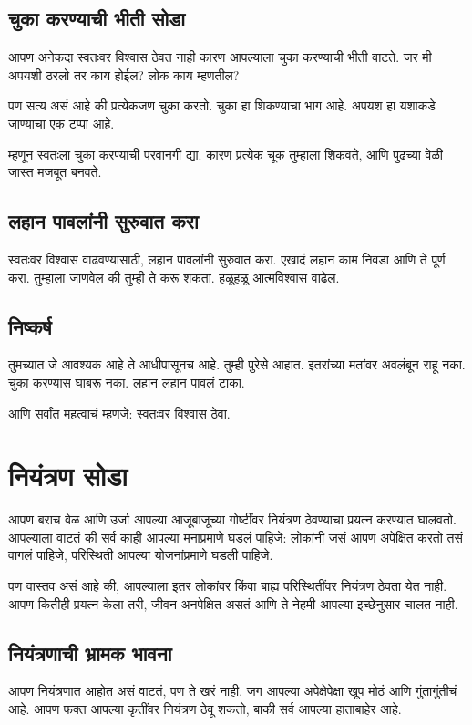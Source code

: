 \section*{चुका करण्याची भीती सोडा}
आपण अनेकदा स्वतःवर विश्वास ठेवत नाही कारण 
आपल्याला चुका करण्याची भीती वाटते. 
जर मी अपयशी ठरलो तर काय होईल? 
लोक काय म्हणतील? 

पण सत्य असं आहे की प्रत्येकजण चुका करतो. 
चुका हा शिकण्याचा भाग आहे. 
अपयश हा यशाकडे जाण्याचा एक टप्पा आहे. 

म्हणून स्वतःला चुका करण्याची परवानगी द्या. 
कारण प्रत्येक चूक तुम्हाला शिकवते, 
आणि पुढच्या वेळी जास्त मजबूत बनवते. 

\section*{लहान पावलांनी सुरुवात करा}
स्वतःवर विश्वास वाढवण्यासाठी, 
लहान पावलांनी सुरुवात करा. 
एखादं लहान काम निवडा आणि ते पूर्ण करा. 
तुम्हाला जाणवेल की तुम्ही ते करू शकता. 
हळूहळू आत्मविश्वास वाढेल. 

\section*{निष्कर्ष}
तुमच्यात जे आवश्यक आहे ते आधीपासूनच आहे. 
तुम्ही पुरेसे आहात. 
इतरांच्या मतांवर अवलंबून राहू नका. 
चुका करण्यास घाबरू नका. 
लहान लहान पावलं टाका. 

आणि सर्वांत महत्वाचं म्हणजे: 
स्वतःवर विश्वास ठेवा. 



\chapter{नियंत्रण सोडा}

आपण बराच वेळ आणि उर्जा आपल्या आजूबाजूच्या गोष्टींवर नियंत्रण ठेवण्याचा प्रयत्न करण्यात घालवतो.  
आपल्याला वाटतं की सर्व काही आपल्या मनाप्रमाणे घडलं पाहिजे:  
लोकांनी जसं आपण अपेक्षित करतो तसं वागलं पाहिजे,  
परिस्थिती आपल्या योजनांप्रमाणे घडली पाहिजे.  

पण वास्तव असं आहे की,  
आपल्याला इतर लोकांवर किंवा बाह्य परिस्थितींवर नियंत्रण ठेवता येत नाही.  
आपण कितीही प्रयत्न केला तरी,  
जीवन अनपेक्षित असतं आणि ते नेहमी आपल्या इच्छेनुसार चालत नाही.  

\section*{नियंत्रणाची भ्रामक भावना}
आपण नियंत्रणात आहोत असं वाटतं,  
पण ते खरं नाही.  
जग आपल्या अपेक्षेपेक्षा खूप मोठं आणि गुंतागुंतीचं आहे.  
आपण फक्त आपल्या कृतींवर नियंत्रण ठेवू शकतो,  
बाकी सर्व आपल्या हाताबाहेर आहे.  

